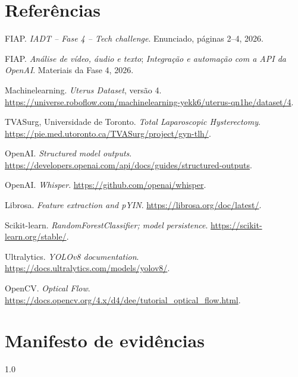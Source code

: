 \documentclass[12pt,a4paper]{article}
\begin{document}
\section{Referências}
\begingroup\singlespacing\small
\begin{enumerate}[label={[\arabic*]},leftmargin=2em]
\item FIAP. \textit{IADT -- Fase 4 -- Tech challenge}. Enunciado, páginas 2--4, 2026.
\item FIAP. \textit{Análise de vídeo, áudio e texto}; \textit{Integração e automação com a API da OpenAI}. Materiais da Fase 4, 2026.
\item Machinelearning. \textit{Uterus Dataset}, versão 4. \url{https://universe.roboflow.com/machinelearning-yekk6/uterus-qn1he/dataset/4}.
\item TVASurg, Universidade de Toronto. \textit{Total Laparoscopic Hysterectomy}. \url{https://pie.med.utoronto.ca/TVASurg/project/gyn-tlh/}.
\item OpenAI. \textit{Structured model outputs}. \url{https://developers.openai.com/api/docs/guides/structured-outputs}.
\item OpenAI. \textit{Whisper}. \url{https://github.com/openai/whisper}.
\item Librosa. \textit{Feature extraction and pYIN}. \url{https://librosa.org/doc/latest/}.
\item Scikit-learn. \textit{RandomForestClassifier; model persistence}. \url{https://scikit-learn.org/stable/}.
\item Ultralytics. \textit{YOLOv8 documentation}. \url{https://docs.ultralytics.com/models/yolov8/}.
\item OpenCV. \textit{Optical Flow}. \url{https://docs.opencv.org/4.x/d4/dee/tutorial_optical_flow.html}.
\end{enumerate}
\endgroup
\clearpage
\appendix
\section{Manifesto de evidências}
\begin{spacing}{1.0}\ManifestoEvidencias\end{spacing}
\end{document}
